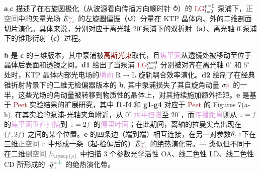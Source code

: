 \textbf{a},\textbf{c} 描述了在\textcolor{NavyBlue}{右旋圆极化}（从\textcolor{NavyBlue}{波源}看向传播方向顺时针 ⥁）的 $\textcolor{Maroon}{\text{LG}}^{p=0}_{l=2}$ \textcolor{NavyBlue}{泵浦}下，\textcolor{gray}{正空间}中的\textcolor{PineGreen}{矢量光场} $\bar{E}^{\;\!\mathcolor{gray}{\omega}}_{\;\! \textcolor{Maroon}{\Yup} \mathcolor{gray}{z}}$ 的\textcolor{NavyBlue}{左旋圆偏振}（↺）分量在 KTP 晶体内、外的二维剖面切片演化。具体来说，分别对应于离\textcolor{PineGreen}{光轴} $20^\circ$泵浦下的\textcolor{PineGreen}{双折射}（\textbf{a}）、离\textcolor{PineGreen}{光轴} $0^\circ$泵浦下的\textcolor{PineGreen}{锥形衍射}（\textbf{c}）过程。

\textbf{b} 是 \textbf{c} 的三维版本，其中\textcolor{NavyBlue}{泵浦}被\textcolor{Maroon}{高斯光束}取代，且\textcolor{Plum}{焦平面}从透镜处被移动至位于晶体后表面和透镜之间。\textbf{d1} 给出了当\textcolor{NavyBlue}{泵浦} $\textcolor{Maroon}{\text{LG}}^{p=0}_{l=2}$ 分别被对齐在离\textcolor{PineGreen}{光轴} $0^\circ$ 和 $5^\circ$ 处时，KTP 晶体内部\textcolor{PineGreen}{光电场}的\textcolor{Plum}{横向} R$\to$L \textcolor{NavyBlue}{旋轨耦合}效率演化。\textbf{d2} 绘制了在经典\textcolor{PineGreen}{锥折射}背景下的二维\textcolor{PineGreen}{无检偏器}版本的 \textbf{b}, 其中\textcolor{NavyBlue}{泵浦}损失了其\textcolor{NavyBlue}{自旋角动量} $\sigma_{\textcolor{Maroon}{\text{P}}}$ 的一半，这些光场的\textcolor{NavyBlue}{角动量}被转移到物质性的晶体上，对其持续施加\textcolor{NavyBlue}{额外扭矩}\cite{berryOrbitalSpinAngular2005}。\textbf{e} 是基于 \textcolor{Maroon}{Peet} 实验结果的扩展研究，其中 \textbf{f1}-\textbf{f4} 和 \textbf{g1}-\textbf{g4} 对应于 \textcolor{Maroon}{Peet} 的 Figures 7(a-h)\cite{peetExperimentalStudyInternal2014}, 在其实验的\textcolor{NavyBlue}{泵浦}-\textcolor{PineGreen}{光轴}夹角附近，从 $0^\circ$ \textcolor{Plum}{水平扫描}至 $20^\circ$，而\textcolor{Plum}{传播距离}则从 $\mathcolor{gray}{z}=\mathcolor{gray}{f}$ 的\textcolor{Plum}{焦平面}\textcolor{Plum}{垂直扫描}到 $\mathcolor{gray}{z}=2\mathcolor{gray}{f}$ 的\textcolor{Plum}{傅里叶面}；在此期间，\textcolor{PineGreen}{离轴}的\textcolor{PineGreen}{拉曼尖点}出现在 $(\mathcolor{gray}{f},2\mathcolor{gray}{f})$ 之间的某个位置。\textbf{e} 的四条边（端到端）相互连接，在另一对参数$\theta,\mathcolor{gray}{z}$下在三维\textcolor{gray}{正空间} $\mathcolor{gray}{\bar{r}}$ 中形成一条（\textcolor{PineGreen}{起-检偏}后的）$\bar{E}^{\;\!\mathcolor{gray}{\omega}}_{\;\! \textcolor{Maroon}{\Yup} \mathcolor{gray}{z}}$ 的\textcolor{NavyBlue}{绝热演化}带。--- 类似但不同于  在二维\textcolor{gray}{倒空间} $\mathcolor{gray}{\bar{k}_{\symup{\rho}}}$ 中扫描 3 个参数\textcolor{NavyBlue}{光学活性 OA}、\textcolor{NavyBlue}{线二色性 LD}、\textcolor{NavyBlue}{线二色性 CD} 所形成的 $\Xint{{}^{}_{\mathcolor{gray}{-}}}{10}{\bar{g}}^{\;\!\mathcolor{gray}{\omega} \textcolor{PineGreen}{\pm}}_{\;\! \textcolor{Maroon}{\Yup}}$ 的\textcolor{NavyBlue}{绝热演化}带。

